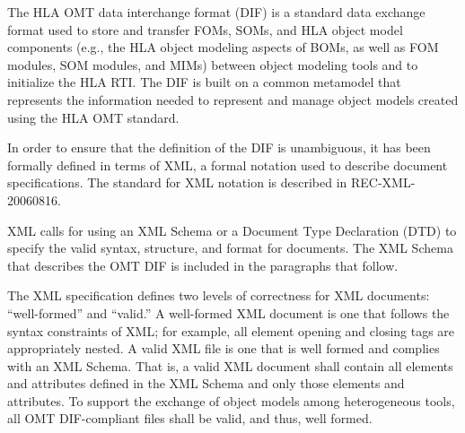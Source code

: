 \newpage
\begingroup
\annexbodyfont
\setlength{\parskip}{12pt plus 1pt minus 1pt}
The HLA OMT data interchange format (DIF) is a standard data exchange format used to store and transfer FOMs, SOMs, and HLA object model components (e.g., the HLA object modeling aspects of BOMs, as well as FOM modules, SOM modules, and MIMs) between object modeling tools and to initialize the HLA RTI. The DIF is built on a common metamodel that represents the information needed to represent and manage object models created using the HLA OMT standard.

In order to ensure that the definition of the DIF is unambiguous, it has been formally defined in terms of XML, a formal notation used to describe document specifications. The standard for XML notation is described in REC-XML-20060816.

\vspace{14pt}
XML calls for using an XML Schema or a Document Type Declaration (DTD) to specify the valid syntax, structure, and format for documents. The XML Schema that describes the OMT DIF is included in the paragraphs that follow.

The XML specification defines two levels of correctness for XML documents: ``well-formed'' and ``valid.'' A well-formed XML document is one that follows the syntax constraints of XML; for example, all element opening and closing tags are appropriately nested. A valid XML file is one that is well formed and complies with an XML Schema. That is, a valid XML document shall contain all elements and attributes defined in the XML Schema and only those elements and attributes. To support the exchange of object models among heterogeneous tools, all OMT DIF-compliant files shall be valid, and thus, well formed.

